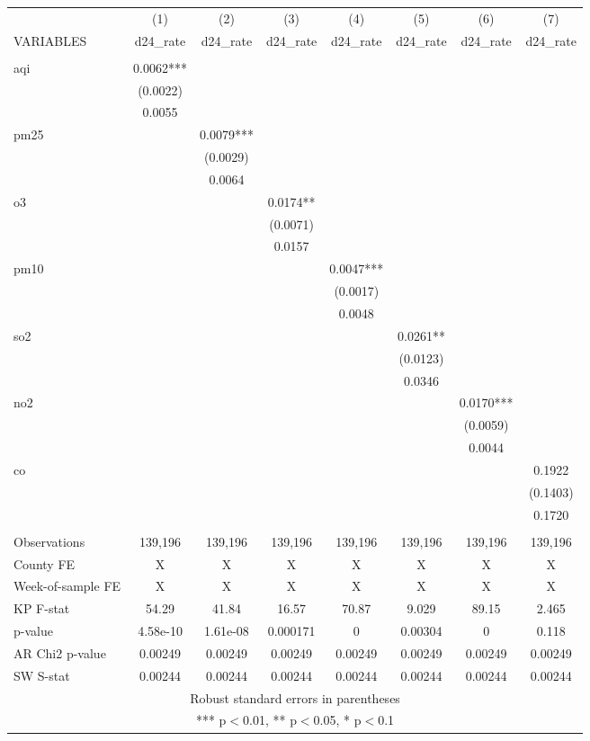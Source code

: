 \documentclass[]{article}
\begin{document}
\begin{tabular}{lccccccc} \hline
 & (1) & (2) & (3) & (4) & (5) & (6) & (7) \\
VARIABLES & d24\_rate & d24\_rate & d24\_rate & d24\_rate & d24\_rate & d24\_rate & d24\_rate \\ \hline
 &  &  &  &  &  &  &  \\
aqi & 0.0062*** &  &  &  &  &  &  \\
 & (0.0022) &  &  &  &  &  &  \\
 & 0.0055 &  &  &  &  &  &  \\
pm25 &  & 0.0079*** &  &  &  &  &  \\
 &  & (0.0029) &  &  &  &  &  \\
 &  & 0.0064 &  &  &  &  &  \\
o3 &  &  & 0.0174** &  &  &  &  \\
 &  &  & (0.0071) &  &  &  &  \\
 &  &  & 0.0157 &  &  &  &  \\
pm10 &  &  &  & 0.0047*** &  &  &  \\
 &  &  &  & (0.0017) &  &  &  \\
 &  &  &  & 0.0048 &  &  &  \\
so2 &  &  &  &  & 0.0261** &  &  \\
 &  &  &  &  & (0.0123) &  &  \\
 &  &  &  &  & 0.0346 &  &  \\
no2 &  &  &  &  &  & 0.0170*** &  \\
 &  &  &  &  &  & (0.0059) &  \\
 &  &  &  &  &  & 0.0044 &  \\
co &  &  &  &  &  &  & 0.1922 \\
 &  &  &  &  &  &  & (0.1403) \\
 &  &  &  &  &  &  & 0.1720 \\
 &  &  &  &  &  &  &  \\
Observations & 139,196 & 139,196 & 139,196 & 139,196 & 139,196 & 139,196 & 139,196 \\
County FE & X & X & X & X & X & X & X \\
Week-of-sample FE & X & X & X & X & X & X & X \\
KP F-stat & 54.29 & 41.84 & 16.57 & 70.87 & 9.029 & 89.15 & 2.465 \\
p-value & 4.58e-10 & 1.61e-08 & 0.000171 & 0 & 0.00304 & 0 & 0.118 \\
AR Chi2 p-value & 0.00249 & 0.00249 & 0.00249 & 0.00249 & 0.00249 & 0.00249 & 0.00249 \\
 SW S-stat & 0.00244 & 0.00244 & 0.00244 & 0.00244 & 0.00244 & 0.00244 & 0.00244 \\ \hline
\multicolumn{8}{c}{ Robust standard errors in parentheses} \\
\multicolumn{8}{c}{ *** p$<$0.01, ** p$<$0.05, * p$<$0.1} \\
\end{tabular}
\end{document}
